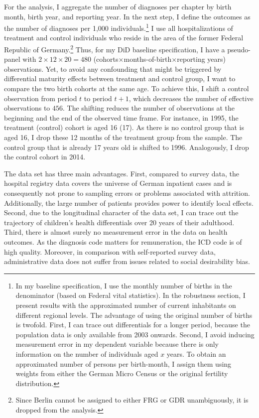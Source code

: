 \documentclass[11pt, a4paper, draft]{article} %
\begin{document}
For the analysis, I aggregate the number of diagnoses per chapter by birth month, birth year, and reporting year. In the next step, I define the outcomes as the number of diagnoses per 1,000 individuals.\footnote{In my baseline specification, I use the monthly number of births in the denominator (based on Federal vital statistics). In the robustness section, I present results with the approximated number of current inhabitants on different regional levels. The advantage of using the original number of births is twofold. First, I can trace out differentials for a longer period, because the population data is only available from 2003 onwards. Second, I avoid inducing measurement error in my dependent variable because there is only information on the number of individuals aged $x$ years. To obtain an approximated number of persons per birth-month, I assign them using weights from either the German Micro Census or the original fertility distribution.} I use all hospitalizations of treatment and control individuals who reside in the area of the former Federal Republic of Germany.\footnote{Since Berlin cannot be assigned to either FRG or GDR unambiguously, it is dropped from the analysis.} Thus, for my DiD baseline specification, I have a pseudo-panel with $2\times12\times20=480$ (cohorts$\times$months-of-birth$\times$reporting years) observations. Yet, to avoid any confounding that might be triggered by differential maturity effects between treatment and control group, I want to compare the two birth cohorts at the same age. To achieve this, I shift a control observation from period $t$ to period $t+1$, which decreases the number of effective observations to $456$. The shifting reduces the number of observations at the beginning and the end of the observed time frame. For instance, in 1995, the treatment (control) cohort is aged 16 (17). As there is no control group that is aged 16, I drop these 12 months of the treatment group from the sample. The control group that is already 17 years old is shifted to 1996. Analogously, I drop the control cohort in 2014. %



The data set has three main advantages. First, compared to survey data, the hospital registry data covers the universe of German inpatient cases and is consequently not prone to sampling errors or problems associated with attrition. Additionally, the large number of patients provides power to identify local effects. Second, due to the longitudinal character of the data set, I can trace out the trajectory of children's health differentials over 20 years of their adulthood. Third, there is almost surely no measurement error in the data on health outcomes. As the diagnosis code matters for remuneration, the ICD code is of high quality. Moreover, in comparison with self-reported survey data, administrative data does not suffer from issues related to social desirability bias.
\end{document}
